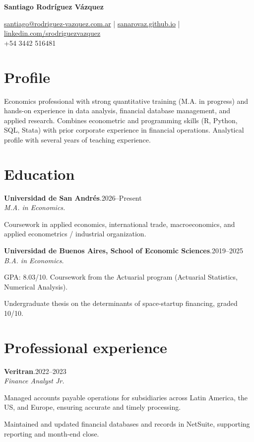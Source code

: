 \documentclass[11pt]{article}
\newcommand{\cvname}{Santiago Rodríguez Vázquez}
\newcommand{\entrydate}[1]{\hfill{\small{#1}}}
\begin{document}
\thispagestyle{firstpage}

{\LARGE\bfseries {\cvname}}

\href{mailto:santiago@rodriguez-vazquez.com.ar}{santiago@rodriguez-vazquez.com.ar} | \href{https://sanarovaz.github.io}{sanarovaz.github.io} | \href{https://www.linkedin.com/in/srodriguezvazquez/?locale=en-US}{linkedin.com/srodriguezvazquez}
\\
+54 3442 516481

\section{Profile}
Economics professional with strong quantitative training (M.A. in progress) and hands-on experience in data analysis, financial database management, and applied research. Combines econometric and programming skills (R, Python, SQL, Stata) with prior corporate experience in financial operations. Analytical profile with several years of teaching experience.

\section{Education}
\textbf{Universidad de San Andrés}.\entrydate{2026--Present}\\
\textit{M.A. in Economics.}
\begin{cvitems}
  \item Coursework in applied economics, international trade, macroeconomics, and applied
        econometrics / industrial organization.
\end{cvitems}

\smallskip
\textbf{Universidad de Buenos Aires, School of Economic Sciences}.\entrydate{2019--2025}\\
\textit{B.A. in Economics.}
\begin{cvitems}
  \item GPA: 8.03/10. Coursework from the Actuarial program (Actuarial Statistics, Numerical Analysis).
  \item Undergraduate thesis on the determinants of space-startup financing, graded 10/10.
\end{cvitems}

\section{Professional experience}
\textbf{Veritran}.\entrydate{2022--2023}\\
\textit{Finance Analyst Jr.}
\begin{cvitems}
  \item Managed accounts payable operations for subsidiaries across Latin America, the US, and Europe,
        ensuring accurate and timely processing.
  \item Maintained and updated financial databases and records in NetSuite, supporting reporting and
        month-end close.
\end{cvitems}
\end{document}
